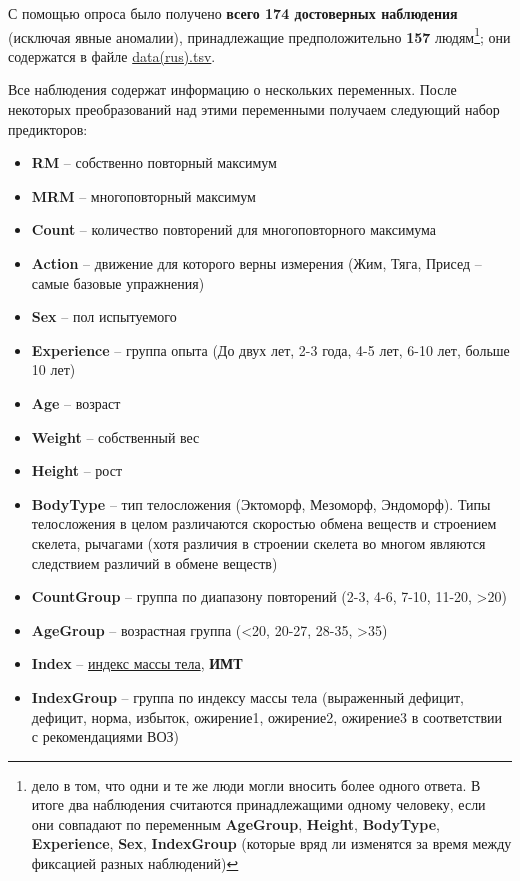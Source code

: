 \documentclass[
]{article}
\begin{document}
С помощью опроса было получено \textbf{всего 174 достоверных наблюдения}
(исключая явные аномалии), принадлежащие предположительно \textbf{157}
людям\footnote{дело в том, что одни и те же люди могли вносить более
  одного ответа. В итоге два наблюдения считаются принадлежащими одному
  человеку, если они совпадают по переменным \textbf{AgeGroup},
  \textbf{Height}, \textbf{BodyType}, \textbf{Experience}, \textbf{Sex},
  \textbf{IndexGroup} (которые вряд ли изменятся за время между
  фиксацией разных наблюдений)}; они содержатся в файле
\href{https://github.com/PasaOpasen/Powerlifting-training-diary-and-articles/blob/master/Estimating\%20RM/data(rus).tsv}{data(rus).tsv}.

Все наблюдения содержат информацию о нескольких переменных. После
некоторых преобразований над этими переменными получаем следующий набор
предикторов:

\begin{itemize}
\item
  \textbf{RM} -- собственно повторный максимум
\item
  \textbf{MRM} -- многоповторный максимум
\item
  \textbf{Count} -- количество повторений для многоповторного максимума
\item
  \textbf{Action} -- движение для которого верны измерения (Жим, Тяга,
  Присед -- самые базовые упражнения)
\item
  \textbf{Sex} -- пол испытуемого
\item
  \textbf{Experience} -- группа опыта (До двух лет, 2-3 года, 4-5 лет,
  6-10 лет, больше 10 лет)
\item
  \textbf{Age} -- возраст
\item
  \textbf{Weight} -- собственный вес
\item
  \textbf{Height} -- рост
\item
  \textbf{BodyType} -- тип телосложения (Эктоморф, Мезоморф, Эндоморф).
  Типы телосложения в целом различаются скоростью обмена веществ и
  строением скелета, рычагами (хотя различия в строении скелета во
  многом являются следствием различий в обмене веществ)
\item
  \textbf{CountGroup} -- группа по диапазону повторений (2-3, 4-6, 7-10,
  11-20, \textgreater20)
\item
  \textbf{AgeGroup} -- возрастная группа (\textless20, 20-27, 28-35,
  \textgreater35)
\item
  \textbf{Index} --
  \href{https://ru.wikipedia.org/wiki/Индекс_массы_тела}{индекс массы
  тела}, \textbf{ИМТ}
\item
  \textbf{IndexGroup} -- группа по индексу массы тела (выраженный
  дефицит, дефицит, норма, избыток, ожирение1, ожирение2, ожирение3 в
  соответствии с рекомендациями ВОЗ)
\end{itemize}
\end{document}

